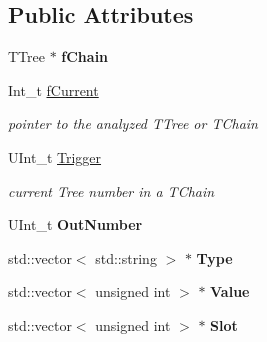 \subsection*{Public Attributes}
\begin{DoxyCompactItemize}
\item 
\hypertarget{classMRDTree_a73df1663124477ad3347f5a894801079}{
TTree $\ast$ {\bfseries fChain}}
\label{classMRDTree_a73df1663124477ad3347f5a894801079}

\item 
\hypertarget{classMRDTree_ae34a2e8a27b9deafeb5d28677c4fe090}{
Int\_\-t \hyperlink{classMRDTree_ae34a2e8a27b9deafeb5d28677c4fe090}{fCurrent}}
\label{classMRDTree_ae34a2e8a27b9deafeb5d28677c4fe090}

\begin{DoxyCompactList}\small\item\em pointer to the analyzed TTree or TChain \item\end{DoxyCompactList}\item 
\hypertarget{classMRDTree_acbb905703b5bd9054df1c685fce4c340}{
UInt\_\-t \hyperlink{classMRDTree_acbb905703b5bd9054df1c685fce4c340}{Trigger}}
\label{classMRDTree_acbb905703b5bd9054df1c685fce4c340}

\begin{DoxyCompactList}\small\item\em current Tree number in a TChain \item\end{DoxyCompactList}\item 
\hypertarget{classMRDTree_ad3a57b2d0d73f13d4fc46d8c3e0c0db8}{
UInt\_\-t {\bfseries OutNumber}}
\label{classMRDTree_ad3a57b2d0d73f13d4fc46d8c3e0c0db8}

\item 
\hypertarget{classMRDTree_aad0e5fe201d44d17706919f231f23b6f}{
std::vector$<$ std::string $>$ $\ast$ {\bfseries Type}}
\label{classMRDTree_aad0e5fe201d44d17706919f231f23b6f}

\item 
\hypertarget{classMRDTree_ad30e310155b90d3d76025fba93cb1082}{
std::vector$<$ unsigned int $>$ $\ast$ {\bfseries Value}}
\label{classMRDTree_ad30e310155b90d3d76025fba93cb1082}

\item 
\hypertarget{classMRDTree_ad8a1fdd22f8e261bcc10527ae89aabc3}{
std::vector$<$ unsigned int $>$ $\ast$ {\bfseries Slot}}
\label{classMRDTree_ad8a1fdd22f8e261bcc10527ae89aabc3}


\end{DoxyCompactItemize}
